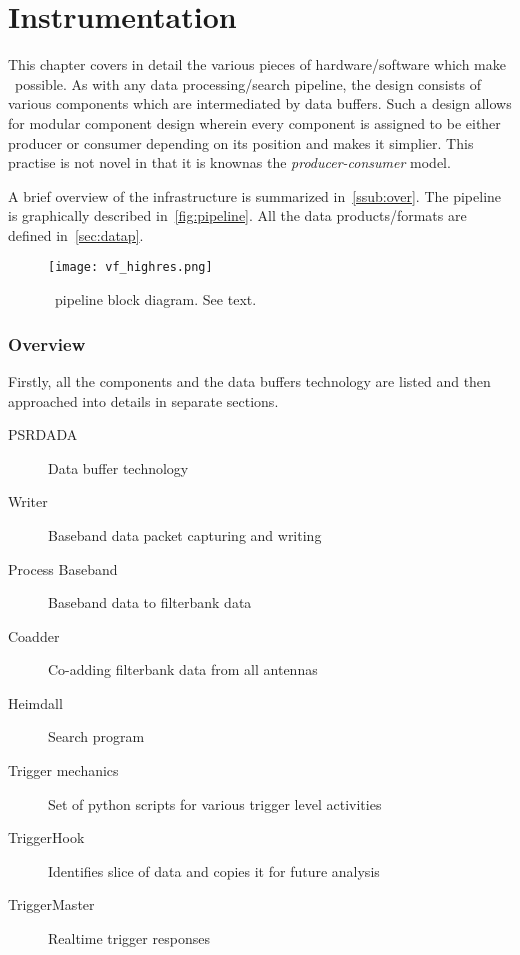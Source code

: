 \chapter{Instrumentation}
\label{ch:inst}

\par This chapter covers in detail the various pieces of hardware/software which make \vf~possible. 
As with any data processing/search pipeline, the design consists of various components which are intermediated by data buffers. 
Such a design allows for modular component design wherein every component is assigned to be either producer or consumer depending on its position and makes it simplier. This practise is not novel in that it is knownas the \emph{producer-consumer} model.

\par A brief overview of the infrastructure is summarized in~\autoref{ssub:over}. 
The pipeline is graphically described in~\autoref{fig:pipeline}. All the data products/formats are defined in~\autoref{sec:datap}.

\begin{figure}[ht]
	\label{fig:pipeline}
	\centering
	\texttt{[image: vf\_highres.png]}
	\caption{\vf~pipeline block diagram. See text.}
\end{figure}

\subsection {Overview}
\label{ssub:over}

\par Firstly, all the components and the data buffers technology are listed and then approached into details in separate sections.
\begin{description}
\item[PSRDADA] Data buffer technology
\item[Writer]  Baseband data packet capturing and writing
\item[Process Baseband] Baseband data to filterbank data
\item[Coadder] Co-adding filterbank data from all antennas
\item[Heimdall] Search program 
\item[Trigger mechanics] Set of python scripts for various trigger level activities
\item[TriggerHook]   Identifies slice of data and copies it for future analysis
\item[TriggerMaster] Realtime trigger responses
\end{description}

